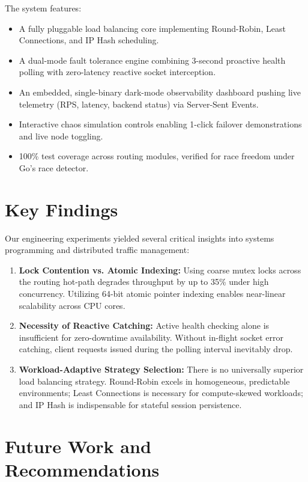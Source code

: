 \documentclass[12pt,openany]{report}
\begin{document}
The system features:
\begin{itemize}
  \item A fully pluggable load balancing core implementing Round-Robin, Least Connections, and IP Hash scheduling.
  \item A dual-mode fault tolerance engine combining 3-second proactive health polling with zero-latency reactive socket interception.
  \item An embedded, single-binary dark-mode observability dashboard pushing live telemetry (RPS, latency, backend status) via Server-Sent Events.
  \item Interactive chaos simulation controls enabling 1-click failover demonstrations and live node toggling.
  \item 100\% test coverage across routing modules, verified for race freedom under Go's race detector.
\end{itemize}

\section{Key Findings}

Our engineering experiments yielded several critical insights into systems programming and distributed traffic management:
\begin{enumerate}
  \item \textbf{Lock Contention vs. Atomic Indexing:} Using coarse mutex locks across the routing hot-path degrades throughput by up to 35\% under high concurrency. Utilizing 64-bit atomic pointer indexing enables near-linear scalability across CPU cores.
  \item \textbf{Necessity of Reactive Catching:} Active health checking alone is insufficient for zero-downtime availability. Without in-flight socket error catching, client requests issued during the polling interval inevitably drop.
  \item \textbf{Workload-Adaptive Strategy Selection:} There is no universally superior load balancing strategy. Round-Robin excels in homogeneous, predictable environments; Least Connections is necessary for compute-skewed workloads; and IP Hash is indispensable for stateful session persistence.
\end{enumerate}

\section{Future Work and Recommendations}
\end{document}
